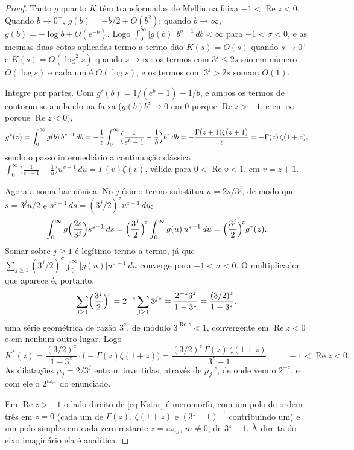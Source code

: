 \documentclass[11pt]{amsart}
\theoremstyle{plain}
\theoremstyle{definition}
\theoremstyle{remark}
\begin{document}
\begin{proof}
Tanto $g$ quanto $K$ têm transformadas de Mellin na faixa $-1<\operatorname{Re}z<0$. Quando
$b\to0^+$, $g(b)=-b/2+O(b^2)$; quando $b\to\infty$, $g(b)=-\log b+O(e^{-b})$. Logo $\int_0^\infty
|g(b)|\,b^{\sigma-1}\,db<\infty$ para $-1<\sigma<0$, e as mesmas duas cotas aplicadas termo a termo
dão $K(s)=O(s)$ quando $s\to0^+$ e $K(s)=O(\log^2 s)$ quando $s\to\infty$: os termos com $3^j\le2s$
são em número $O(\log s)$ e cada um é $O(\log s)$, e os termos com $3^j>2s$ somam $O(1)$.

Integre por partes. Com $g'(b)=1/(e^b-1)-1/b$, e ambos os termos de contorno se anulando na faixa
($g(b)b^z\to0$ em $0$ porque $\operatorname{Re}z>-1$, e em $\infty$ porque $\operatorname{Re}z<0$),
\[
g^*(z) = \int_0^\infty g(b)\,b^{z-1}\,db = -\frac1z\int_0^\infty\Bigl(\frac{1}{e^b-1}-\frac1b\Bigr)b^z\,db
= -\frac{\Gamma(z+1)\zeta(z+1)}{z} = -\Gamma(z)\,\zeta(1+z),
\]
sendo o passo intermediário a continuação clássica
$\int_0^\infty\bigl(\tfrac{1}{e^u-1}-\tfrac1u\bigr)u^{v-1}\,du=\Gamma(v)\zeta(v)$, válida para
$0<\operatorname{Re}v<1$, em $v=z+1$.

Agora a soma harmônica. No $j$-ésimo termo substitua $u=2s/3^j$, de modo que $s=3^ju/2$ e
$s^{z-1}\,ds=(3^j/2)^z u^{z-1}\,du$:
\[
\int_0^\infty g\Bigl(\frac{2s}{3^j}\Bigr)s^{z-1}\,ds = \Bigl(\frac{3^j}{2}\Bigr)^{\!z}\int_0^\infty
g(u)\,u^{z-1}\,du = \Bigl(\frac{3^j}{2}\Bigr)^{\!z} g^*(z).
\]
Somar sobre $j\ge1$ é legítimo termo a termo, já que $\sum_{j\ge1}(3^j/2)^\sigma\int_0^\infty
|g(u)|u^{\sigma-1}\,du$ converge para $-1<\sigma<0$. O multiplicador que aparece é, portanto,
\[
\sum_{j\ge1}\Bigl(\frac{3^j}{2}\Bigr)^{\!z} = 2^{-z}\sum_{j\ge1}3^{jz} = \frac{2^{-z}3^z}{1-3^z}
= \frac{(3/2)^z}{1-3^z},
\]
uma série geométrica de razão $3^z$, de módulo $3^{\operatorname{Re}z}<1$, convergente em
$\operatorname{Re}z<0$ e em nenhum outro lugar. Logo
\begin{equation}
\label{eq:Kstar}
K^*(z) = \frac{(3/2)^z}{1-3^z}\cdot\bigl(-\Gamma(z)\zeta(1+z)\bigr)
= \frac{(3/2)^z\,\Gamma(z)\,\zeta(1+z)}{3^z-1}, \qquad -1<\operatorname{Re}z<0.
\end{equation}
As dilatações $\mu_j=2/3^j$ entram invertidas, através de $\mu_j^{-z}$, de onde vem o $2^{-z}$, e
com ele o $2^{i\omega_m}$ do enunciado.

Em $\operatorname{Re}z>-1$ o lado direito de \eqref{eq:Kstar} é meromorfo, com um polo de ordem
três em $z=0$ (cada um de $\Gamma(z)$, $\zeta(1+z)$ e $(3^z-1)^{-1}$ contribuindo um) e um polo
simples em cada zero restante $z=i\omega_m$, $m\ne0$, de $3^z-1$. À direita do eixo imaginário ela
é analítica.


\end{proof}
\end{document}
